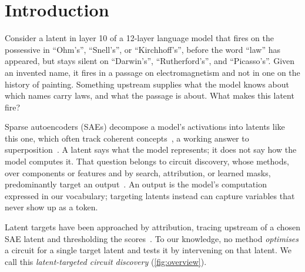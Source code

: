 \documentclass[10pt]{article}
\begin{document}
\section{Introduction}
Consider a latent in layer 10 of a 12-layer language model that fires on the possessive in ``Ohm's'', ``Snell's'', or ``Kirchhoff's'', before the word ``law'' has appeared, but stays silent on ``Darwin's'', ``Rutherford's'', and ``Picasso's''.
Given an invented name, it fires in a passage on electromagnetism and not in one on the history of painting.
Something upstream supplies what the model knows about which names carry laws, and what the passage is about.
What makes this latent fire?

Sparse autoencoders (SAEs) decompose a model's activations into latents like this one, which often track coherent concepts~\citep{cunningham2024sparse, bricken2023monosemanticity, gao2024scaling, templeton2024scaling}, a working answer to superposition~\citep{elhage2022toy}.
A latent says what the model represents; it does not say how the model computes it.
That question belongs to circuit discovery, whose methods, over components or features and by search, attribution, or learned masks, predominantly target an output~\citep{conmy2023towards, syed2023attribution, marks2025sparse, ameisen2025circuit, bhaskar2024finding, caples2025scaling}.
An output is the model's computation expressed in our vocabulary; targeting latents instead can capture variables that never show up as a token.

Latent targets have been approached by attribution, tracing upstream of a chosen SAE latent and thresholding the scores~\citep{ge2024automatically, golimblevskaia2025circuit}.
To our knowledge, no method \emph{optimises} a circuit for a single target latent and tests it by intervening on that latent.
We call this \emph{latent-targeted circuit discovery} (\cref{fig:overview}).
\end{document}

